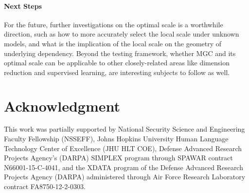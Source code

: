 \documentclass[11pt]{article}
\newcommand{\jv}[1]{{\color{red}{#1}}}
\newcommand{\cs}[1]{{\color{blue}{#1}}}
\begin{document}
\cs{I feel it is not necessary to include next steps in the paper. For example, although the idea to extend two-sample test by local variant is similar to MGC, we shouldn't be too optimistic in this paper before we tried them; also if it does work, probably we don't want to tell others yet :-)}
\jv{good paper writing essentially requires next steps.  it tells people how our work changes the world, what can be achieved next, and in particular, which subset of those things we are planning on doing.}
\cs{I have added sub-sampling, local scale estimation, so on so forth into the next steps. I commented out other next steps that I think is not concrete enough yet; we can add back later. }

\paragraph{Next Steps}
For the future, further investigations on the optimal scale is a worthwhile direction, such as how to more accurately select the local scale under unknown models, and what is the implication of the local scale on the geometry of underlying dependency. Beyond the testing framework, whether MGC and its optimal scale can be applicable to other closely-related areas like dimension reduction and supervised learning, are interesting subjects to follow as well.




\section*{Acknowledgment}
This work was partially supported by 
% 
National Security Science and Engineering Faculty Fellowship (NSSEFF), 
% 
Johns Hopkins University Human Language Technology Center of Excellence (JHU HLT COE), 
% 
Defense Advanced Research Projects Agency's (DARPA) SIMPLEX program through SPAWAR contract N66001-15-C-4041, 
% 
and the XDATA program of the Defense Advanced Research Projects Agency (DARPA) administered through Air Force Research Laboratory contract FA8750-12-2-0303.
\end{document}
